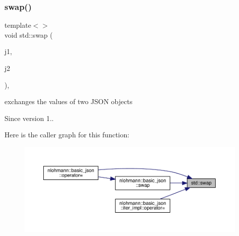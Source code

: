 \subsubsection{\texorpdfstring{swap()}{swap()}}
{\footnotesize\ttfamily template$<$$>$ \\
void std\+::swap (\begin{DoxyParamCaption}\item[{\mbox{\hyperlink{namespacenlohmann_a2bfd99e845a2e5cd90aeaf1b1431f474}{nlohmann\+::json}} \&}]{j1,  }\item[{\mbox{\hyperlink{namespacenlohmann_a2bfd99e845a2e5cd90aeaf1b1431f474}{nlohmann\+::json}} \&}]{j2 }\end{DoxyParamCaption})\hspace{0.3cm}{\ttfamily [inline]}, {\ttfamily [noexcept]}}



exchanges the values of two J\+S\+ON objects 

\begin{DoxySince}{Since}
version 1.. 
\end{DoxySince}
Here is the caller graph for this function\+:
\nopagebreak
\begin{figure}[H]
\begin{center}
\leavevmode
\includegraphics[width=350pt]{namespacestd_a907191b7578e209391ce938e3b2afdf7_icgraph}
\end{center}
\end{figure}
